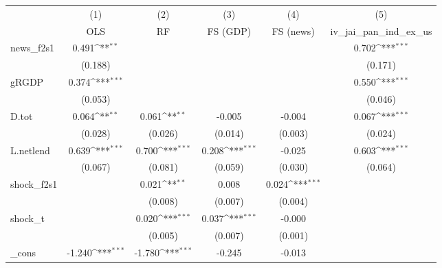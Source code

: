 {
\def\sym#1{\ifmmode^{#1}\else\(^{#1}\)\fi}
\begin{tabular}{l*{5}{c}}
\toprule
            &\multicolumn{1}{c}{(1)}&\multicolumn{1}{c}{(2)}&\multicolumn{1}{c}{(3)}&\multicolumn{1}{c}{(4)}&\multicolumn{1}{c}{(5)}\\
            &\multicolumn{1}{c}{OLS}&\multicolumn{1}{c}{RF}&\multicolumn{1}{c}{FS (GDP)}&\multicolumn{1}{c}{FS (news)}&\multicolumn{1}{c}{iv\_jai\_pan\_ind\_ex\_us}\\
\midrule
news\_f2s1   &       0.491\sym{**} &                     &                     &                     &       0.702\sym{***}\\
            &     (0.188)         &                     &                     &                     &     (0.171)         \\
\addlinespace
gRGDP       &       0.374\sym{***}&                     &                     &                     &       0.550\sym{***}\\
            &     (0.053)         &                     &                     &                     &     (0.046)         \\
\addlinespace
D.tot       &       0.064\sym{**} &       0.061\sym{**} &      -0.005         &      -0.004         &       0.067\sym{***}\\
            &     (0.028)         &     (0.026)         &     (0.014)         &     (0.003)         &     (0.024)         \\
\addlinespace
L.netlend   &       0.639\sym{***}&       0.700\sym{***}&       0.208\sym{***}&      -0.025         &       0.603\sym{***}\\
            &     (0.067)         &     (0.081)         &     (0.059)         &     (0.030)         &     (0.064)         \\
\addlinespace
shock\_f2s1  &                     &       0.021\sym{**} &       0.008         &       0.024\sym{***}&                     \\
            &                     &     (0.008)         &     (0.007)         &     (0.004)         &                     \\
\addlinespace
shock\_t     &                     &       0.020\sym{***}&       0.037\sym{***}&      -0.000         &                     \\
            &                     &     (0.005)         &     (0.007)         &     (0.001)         &                     \\
\addlinespace
\_cons      &      -1.240\sym{***}&      -1.780\sym{***}&      -0.245         &      -0.013         &                     \\

\end{tabular}}
